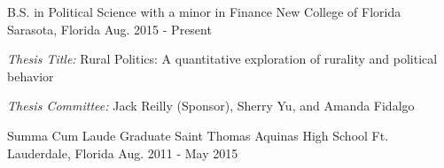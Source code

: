 

\begin{cventries}

  \cventry
    {B.S. in Political Science with a minor in Finance} %
    {New College of Florida} %
    {Sarasota, Florida} %
    {Aug. 2015 - Present} %
    {
    \begin{cvitems}
      \item \emph{Thesis Title:} Rural Politics: A quantitative exploration of rurality and political behavior
      \item \emph{Thesis Committee:} Jack Reilly (Sponsor), Sherry Yu, and Amanda Fidalgo 
    \end{cvitems}
  }

  \cventry
    {Summa Cum Laude Graduate} %
    {Saint Thomas Aquinas High School} %
    {Ft. Lauderdale, Florida} %
    {Aug. 2011 - May 2015} %
    {}


\vspace{-.1cm}


\end{cventries}
